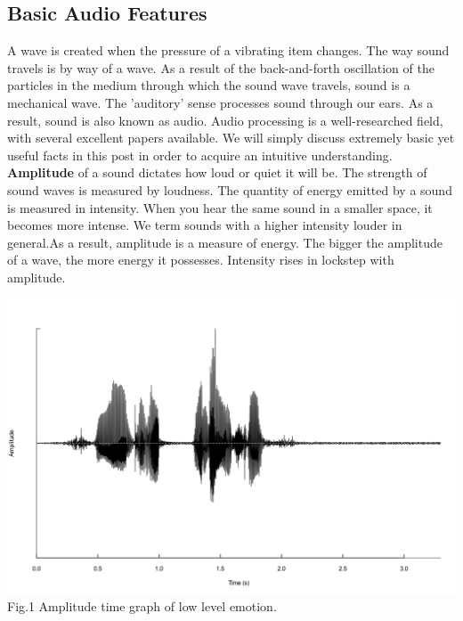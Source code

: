 \documentclass[11pt,a4paper]{article}
\begin{document}
	\subsection{Basic Audio Features}
	A wave is created when the pressure of a vibrating item changes. The way sound travels is by way of a wave.
	As a result of the back-and-forth oscillation of the particles in the medium through which the sound wave travels, sound is a mechanical wave. The 'auditory' sense processes sound through our ears. As a result, sound is also known as audio. Audio processing is a well-researched field, with several excellent papers available. We will simply discuss extremely basic yet useful facts in this post in order to acquire an intuitive understanding. \\
  \textbf{Amplitude }of a sound dictates how loud or quiet it will be. The strength of sound waves is measured by loudness. The quantity of energy emitted by a sound is measured in intensity. When you hear the same sound in a smaller space, it becomes more intense. We term sounds with a higher intensity louder in general.As a result, amplitude is a measure of energy. The bigger the amplitude of a wave, the more energy it possesses. Intensity rises in lockstep with amplitude.\\ 
      \begin{center}
  	
  	\includegraphics[scale=0.24]{LEVEL_0.png} \\ 
  	Fig.1 Amplitude time graph of low level emotion. \\
  	
  \end{center} 
\end{document}
